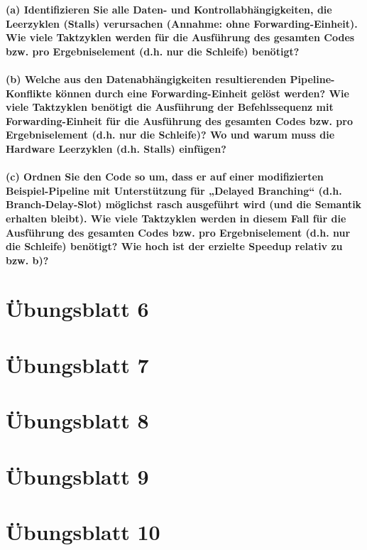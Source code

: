 \documentclass[11pt]{article}
\begin{document}
    \textbf{(a) Identifizieren Sie alle Daten- und Kontrollabhängigkeiten, die Leerzyklen (Stalls)
    verursachen (Annahme: ohne Forwarding-Einheit). Wie viele Taktzyklen werden für die
    Ausführung des gesamten Codes bzw. pro Ergebniselement (d.h. nur die Schleife)
    benötigt?\\\\
    (b) Welche aus den Datenabhängigkeiten resultierenden Pipeline-Konflikte können durch
    eine Forwarding-Einheit gelöst werden? Wie viele Taktzyklen benötigt die Ausführung der
    Befehlssequenz mit Forwarding-Einheit für die Ausführung des gesamten Codes bzw. pro
    Ergebniselement (d.h. nur die Schleife)? Wo und warum muss die Hardware Leerzyklen
    (d.h. Stalls) einfügen?\\\\
    (c) Ordnen Sie den Code so um, dass er auf einer modifizierten Beispiel-Pipeline mit
    Unterstützung für „Delayed Branching“ (d.h. Branch-Delay-Slot) möglichst rasch
    ausgeführt wird (und die Semantik erhalten bleibt). Wie viele Taktzyklen werden in diesem
    Fall für die Ausführung des gesamten Codes bzw. pro Ergebniselement (d.h. nur die
    Schleife) benötigt? Wie hoch ist der erzielte Speedup relativ zu bzw. b)?}


\section{Übungsblatt 6}


\section{Übungsblatt 7}


\section{Übungsblatt 8}


\section{Übungsblatt 9}


\section{Übungsblatt 10}

    
\end{document}
